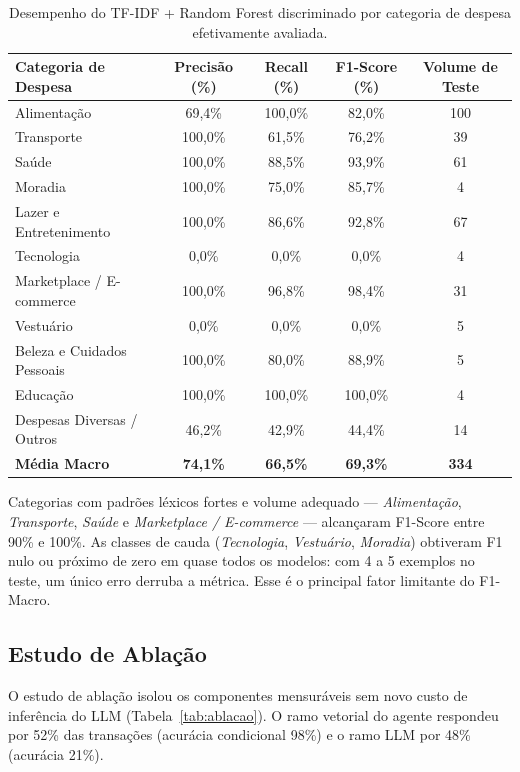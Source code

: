 \begin{table}[htb]
	\centering
	\caption{Desempenho do TF-IDF + Random Forest discriminado por categoria de despesa efetivamente avaliada.}
	\label{tab:resultados_categorias}
	\begin{tabularx}{\textwidth}{X c c c c}
		\toprule
		\textbf{Categoria de Despesa} & \textbf{Precisão (\%)} & \textbf{Recall (\%)} & \textbf{F1-Score (\%)} & \textbf{Volume de Teste} \\
		\midrule
		Alimentação & 69,4\% & 100,0\% & 82,0\% & 100 \\
		Transporte & 100,0\% & 61,5\% & 76,2\% & 39 \\
		Saúde & 100,0\% & 88,5\% & 93,9\% & 61 \\
		Moradia & 100,0\% & 75,0\% & 85,7\% & 4 \\
		Lazer e Entretenimento & 100,0\% & 86,6\% & 92,8\% & 67 \\
		Tecnologia & 0,0\% & 0,0\% & 0,0\% & 4 \\
		Marketplace / E-commerce & 100,0\% & 96,8\% & 98,4\% & 31 \\
		Vestuário & 0,0\% & 0,0\% & 0,0\% & 5 \\
		Beleza e Cuidados Pessoais & 100,0\% & 80,0\% & 88,9\% & 5 \\
		Educação & 100,0\% & 100,0\% & 100,0\% & 4 \\
		Despesas Diversas / Outros & 46,2\% & 42,9\% & 44,4\% & 14 \\
		\midrule
		\textbf{Média Macro} & \textbf{74,1\%} & \textbf{66,5\%} & \textbf{69,3\%} & \textbf{334} \\
		\bottomrule
	\end{tabularx}
\end{table}


Categorias com padrões léxicos fortes e volume adequado --- \textit{Alimentação},
\textit{Transporte}, \textit{Saúde} e \textit{Marketplace / E-commerce} ---
alcançaram F1-Score entre 90\% e 100\%. As classes de cauda (\textit{Tecnologia},
\textit{Vestuário}, \textit{Moradia}) obtiveram F1 nulo ou próximo de zero em quase
todos os modelos: com 4 a 5 exemplos no teste, um único erro derruba a métrica. Esse é o
principal fator limitante do F1-Macro.

\subsection{Estudo de Ablação}
O estudo de ablação isolou os componentes mensuráveis sem novo custo de inferência do LLM
(Tabela~\ref{tab:ablacao}). O ramo vetorial do agente respondeu por 52\% das transações (acurácia condicional 98\%) e o ramo LLM por 48\% (acurácia 21\%).

